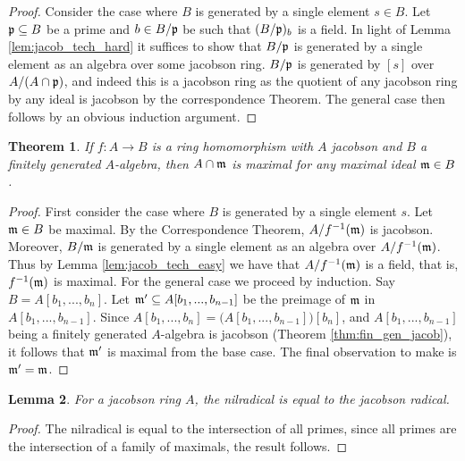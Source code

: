 \documentclass[12pt]{article}
\theoremstyle{plain}
\newtheorem{thm}{Theorem}[subsection] %
\newtheorem{lemma}[thm]{Lemma}
\theoremstyle{definition}
\begin{document}
\begin{proof}
Consider the case where $B$ is generated by a single element $s \in B$. Let $\frak{p} \subseteq B$ be a prime and $b \in B/\frak{p}$ be such that $(B/\frak{p})_b$ is a field. In light of Lemma \ref{lem:jacob_tech_hard} it suffices to show that $B/\frak{p}$ is generated by a single element as an algebra over some jacobson ring. $B/\frak{p}$ is generated by $[s]$ over $A/(A \cap \frak{p})$, and indeed this is a jacobson ring as the quotient of any jacobson ring by any ideal is jacobson by the correspondence Theorem. The general case then follows by an obvious induction argument.
\end{proof}
\begin{thm}\label{thm:jacob_preimage}
If $f: A \to B$ is a ring homomorphism with $A$ jacobson and $B$ a finitely generated $A$-algebra, then $A \cap \frak{m}$ is maximal for any maximal ideal $\frak{m} \in B$.
\end{thm}
\begin{proof}
First consider the case where $B$ is generated by a single element $s$. Let $\frak{m} \in B$ be maximal. By the Correspondence Theorem, $A/f^{-1}(\frak{m})$ is jacobson. Moreover, $B/\frak{m}$ is generated by a single element as an algebra over $A/f^{-1}(\frak{m})$. Thus by Lemma \ref{lem:jacob_tech_easy} we have that $A/f^{-1}(\frak{m})$ is a field, that is, $f^{-1}(\frak{m})$ is maximal. For the general case we proceed by induction. Say $B = A[b_1,...,b_n]$. Let $\frak{m}' \subseteq A[b_1,...,b_{n-1}]$ be the preimage of $\frak{m}$ in $A[b_1,...,b_{n-1}]$. Since $A[b_1,...,b_{n}] = \big(A[b_1,...,b_{n-1}]\big)[b_n]$, and $A[b_1,...,b_{n-1}]$ being a finitely generated $A$-algebra is jacobson (Theorem \ref{thm:fin_gen_jacob}), it follows that $\frak{m}'$ is maximal from the base case. The final observation to make is $\frak{m}' = \frak{m}$.
\end{proof}
\begin{lemma}\label{lem:jacob_easy}
For a jacobson ring $A$, the nilradical is equal to the jacobson radical.
\end{lemma}
\begin{proof}
The nilradical is equal to the intersection of all primes, since all primes are the intersection of a family of maximals, the result follows.
\end{proof}
\end{document}
